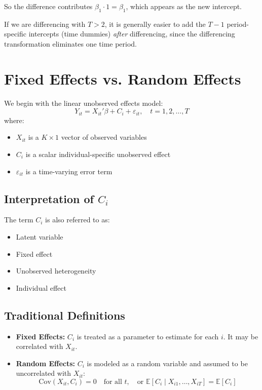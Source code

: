 \documentclass[12pt, oneside]{article}
\begin{document}
So the difference contributes \( \beta_1 \cdot 1 = \beta_1 \), which appears as the new intercept.

\bigskip
\noindent
If we are differencing with \( T > 2 \), it is generally easier to add the \( T - 1 \) period-specific intercepts (time dummies) \emph{after} differencing, since the differencing transformation eliminates one time period.
\section*{Fixed Effects vs. Random Effects}

We begin with the linear unobserved effects model:
\[
Y_{it} = X_{it}' \beta + C_i + \varepsilon_{it}, \quad t = 1, 2, \dots, T
\]
where:
\begin{itemize}
    \item \( X_{it} \) is a \( K \times 1 \) vector of observed variables
    \item \( C_i \) is a scalar individual-specific unobserved effect
    \item \( \varepsilon_{it} \) is a time-varying error term
\end{itemize}

\subsection*{Interpretation of \( C_i \)}

The term \( C_i \) is also referred to as:
\begin{itemize}
    \item Latent variable
    \item Fixed effect
    \item Unobserved heterogeneity
    \item Individual effect
\end{itemize}

\subsection*{Traditional Definitions}

\begin{itemize}
    \item \textbf{Fixed Effects:} \( C_i \) is treated as a parameter to estimate for each \( i \). It may be correlated with \( X_{it} \).
    \item \textbf{Random Effects:} \( C_i \) is modeled as a random variable and assumed to be uncorrelated with \( X_{it} \):
    \[
    \text{Cov}(X_{it}, C_i) = 0 \quad \text{for all } t, \quad \text{or } \mathbb{E}[C_i \mid X_{i1}, \dots, X_{iT}] = \mathbb{E}[C_i]
    \]
\end{itemize}
\end{document}
